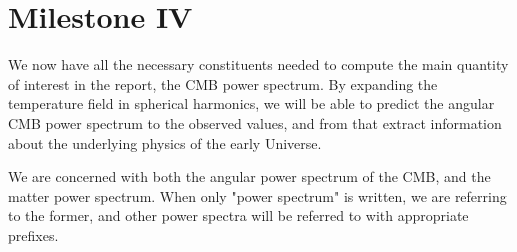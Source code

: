 \section{Milestone IV}\label{sec:M4}
We now have all the necessary constituents needed to compute the main quantity of interest in the report, the CMB power spectrum. By expanding the temperature field in spherical harmonics, we will be able to predict the angular CMB power spectrum to the observed values, and from that extract information about the underlying physics of the early Universe.  

We are concerned with both the angular power spectrum of the CMB, and the matter power spectrum. When only "power spectrum" is written, we are referring to the former, and other power spectra will be referred to with appropriate prefixes.   




 